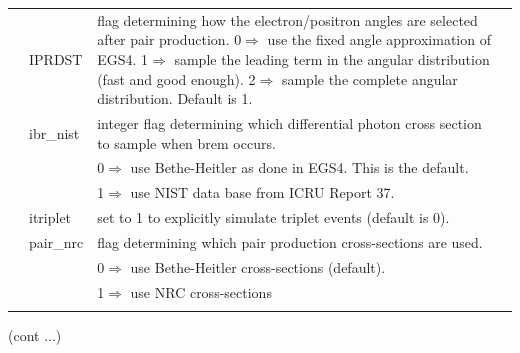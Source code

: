 \begin{table}[hb]
\begin{center}
\begin{tabular}{ l  l   p{105mm}l  |}
& IPRDST &flag determining how the electron/positron angles are selected
after pair production. 0$\Rightarrow$ use the fixed angle approximation of
EGS4. 1$\Rightarrow$ sample the leading term in the angular distribution
(fast and good enough). 2$\Rightarrow$ sample the complete angular distribution.  Default is 1.\\

& ibr\_nist& integer flag determining which differential photon cross section
to sample when brem occurs.\\
&& 0$\Rightarrow$ use Bethe-Heitler as done in EGS4. This is the default.\\
&& 1$\Rightarrow$ use NIST data base from ICRU Report 37.\\
& itriplet & set to 1 to explicitly simulate triplet events (default is 0).\\
& pair\_nrc & flag determining which pair production cross-sections are used.\\
&& 0$\Rightarrow$ use Bethe-Heitler cross-sections (default).\\
&& 1$\Rightarrow$ use NRC cross-sections \\
&&\\
\hline
    \end{tabular}
    \end{center}
    \mbox{}\hfill (cont ...)\\
    \end{table}
    \clearpage

